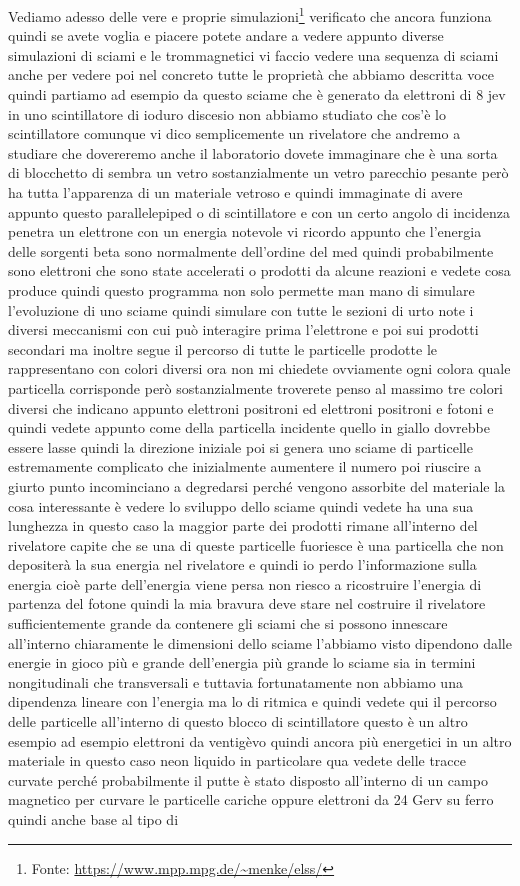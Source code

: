 {Vediamo adesso delle vere e proprie simulazioni\footnote{Fonte: \url{https://www.mpp.mpg.de/~menke/elss/}} verificato che ancora funziona quindi se avete voglia e piacere potete andare a vedere appunto diverse simulazioni di sciami e le trommagnetici vi faccio vedere una sequenza di sciami anche per vedere poi nel concreto tutte le proprietà che abbiamo descritta voce quindi partiamo ad esempio da questo sciame che è generato da elettroni di 8 jev in uno scintillatore di ioduro discesio non abbiamo studiato che cos'è lo scintillatore comunque vi dico semplicemente un rivelatore che andremo a studiare che dovereremo anche il laboratorio dovete immaginare che è una sorta di blocchetto di sembra un vetro sostanzialmente un vetro parecchio pesante però ha tutta l'apparenza di un materiale vetroso e quindi immaginate di avere appunto questo parallelepiped o di scintillatore e con un certo angolo di incidenza penetra un elettrone con un energia notevole vi ricordo appunto che l'energia delle sorgenti beta sono normalmente dell'ordine del med quindi probabilmente sono elettroni che sono state accelerati o prodotti da alcune reazioni e vedete cosa produce quindi questo programma non solo permette man mano di simulare l'evoluzione di uno sciame quindi simulare con tutte le sezioni di urto note i diversi meccanismi con cui può interagire prima l'elettrone e poi sui prodotti secondari ma inoltre segue il percorso di tutte le particelle prodotte le rappresentano con colori diversi ora non mi chiedete ovviamente ogni colora quale particella corrisponde però sostanzialmente troverete penso al massimo tre colori diversi che indicano appunto elettroni positroni ed elettroni positroni e fotoni e quindi vedete appunto come della particella incidente quello in giallo dovrebbe essere lasse quindi la direzione iniziale poi si genera uno sciame di particelle estremamente complicato che inizialmente aumentere il numero poi riuscire a giurto punto incominciano a degredarsi perché vengono assorbite del materiale la cosa interessante è vedere lo sviluppo dello sciame quindi vedete ha una sua lunghezza in questo caso la maggior parte dei prodotti rimane all'interno del rivelatore capite che se una di queste particelle fuoriesce è una particella che non depositerà la sua energia nel rivelatore e quindi io perdo l'informazione sulla energia cioè parte dell'energia viene persa non riesco a ricostruire l'energia di partenza del fotone quindi la mia bravura deve stare nel costruire il rivelatore sufficientemente grande da contenere gli sciami che si possono innescare all'interno chiaramente le dimensioni dello sciame l'abbiamo visto dipendono dalle energie in gioco più e grande dell'energia più grande lo sciame sia in termini nongitudinali che transversali e tuttavia fortunatamente non abbiamo una dipendenza lineare con l'energia ma lo di ritmica e quindi vedete qui il percorso delle particelle all'interno di questo blocco di scintillatore questo è un altro esempio ad esempio elettroni da ventigèvo quindi ancora più energetici in un altro materiale in questo caso neon liquido in particolare qua vedete delle tracce curvate perché probabilmente il putte è stato disposto all'interno di un campo magnetico per curvare le particelle cariche oppure elettroni da 24 Gerv su ferro quindi anche base al tipo di }
